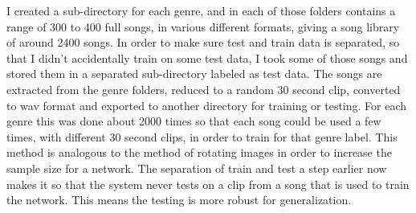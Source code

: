 \documentclass[10pt,twocolumn,letterpaper]{article}
\begin{document}
I created a sub-directory for each genre, and in each of those folders contains a range of 300 to 400 full songs, in various different formats, giving a song library of around 2400 songs. In order to make sure test and train data is separated, so that I didn't accidentally train on some test data, I took some of those songs and stored them in a separated sub-directory labeled as test data. The songs are extracted from the genre folders, reduced to a random 30 second clip, converted to wav format and exported to another directory for training or testing. For each genre this was done about 2000 times so that each song could be used a few times, with different 30 second clips, in order to train for that genre label. This method is analogous to the method of rotating images in order to increase the sample size for a network. The separation of train and test a step earlier now makes it so that the system never tests on a clip from a song that is used to train the network. This means the testing is more robust for generalization. 
\end{document}
